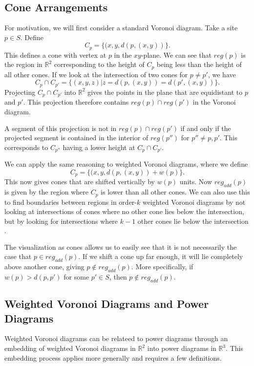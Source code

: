 \documentclass[a4paper, 11pt]{article}
\newcommand{\R}{\mathbb{R}}
\begin{document}
\subsection{Cone Arrangements}
\label{cone}
For motivation, we will first consider a standard Voronoi diagram. Take a site $p \in S$. Define
\[ C_p = \{ (x, y, d(p, (x,y)) \}. \]
This defines a cone with vertex at $p$ in the $xy$-plane. We can see that $reg(p)$ is the region in $\R^2$ corresponding to the height of $C_p$ being
less than the height of all other cones. If we look at the intersection of two cones for $p \neq p'$, we have
\[ C_p \cap C_{p'} = \{ (x,y,z) | z = d(p, (x,y)) = d(p', (x,y)) \}. \]
Projecting $C_p \cap C_{p'}$ into $\R^2$ gives the points in the plane that are equidistant to $p$ and $p'$. This projection therefore contains
$reg(p) \cap reg(p')$ in the Voronoi diagram.

A segment of this projection is not in $reg(p) \cap reg(p')$ if and only if the projected segment is contained in the interior of $reg(p'')$ for $p''
\neq p, p'$. This corresponds to $C_{p''}$ having a lower height at $C_p \cap C_{p'}$.

We can apply the same reasoning to weighted Voronoi diagrams, where we define
\[ C_p = \{ (x, y, d(p, (x,y)) + w(p) \}. \]
This now gives cones that are shifted vertically by $w(p)$ units. Now $reg_{add}(p)$ is given by the region where $C_p$ is lower than all other cones.
We can also use this to find boundaries between regions in order-$k$ weighted Voronoi diagrams by not looking at intersections of cones where no other
cone lies below the intersection, but by looking for intersections where $k-1$ other cones lie below the intersection \cite{rosenberger_additive}.

The visualization as cones allows us to easily see that it is not necessarily the case that $p \in reg_{add}(p)$. If we shift a cone up far enough, it
will lie completely above another cone, giving $p \notin reg_{add}(p)$. More specifically, if $w(p) > d(p,p')$ for some $p' \in S$, then $p \notin
reg_{add}(p)$.

\subsection{Weighted Voronoi Diagrams and Power Diagrams}

Weighted Voronoi diagrams can be relateed to power diagrams through an embedding of weighted Voronoi diagrams in $\R^2$ into power diagrams in $\R^3$.
This embedding process applies more generally and requires a few definitions.
\end{document}
